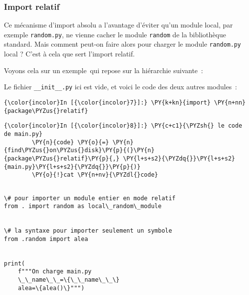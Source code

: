     \hypertarget{import-relatif}{%
\subsubsection{Import relatif}\label{import-relatif}}

    Ce mécanisme d'import absolu a l'avantage d'éviter qu'un module local,
par exemple \texttt{random.py}, ne vienne cacher le module
\texttt{random} de la bibliothèque standard. Mais comment peut-on faire
alors pour charger le module \texttt{random.py} local ? C'est à cela que
sert l'import relatif.

Voyons cela sur un exemple~qui repose sur la hiérarchie suivante~:

\begin{Shaded}
\begin{Highlighting}[frame=lines,framerule=0.6mm,rulecolor=\color{asisframecolor}]
\end{Highlighting}
\end{Shaded}

    Le fichier \texttt{\_\_init\_\_.py} ici est vide, et voici le code des
deux autres modules~:

    \begin{Verbatim}[commandchars=\\\{\},frame=single,framerule=0.3mm,rulecolor=\color{cellframecolor}]
{\color{incolor}In [{\color{incolor}7}]:} \PY{k+kn}{import} \PY{n+nn}{package\PYZus{}relatif}
\end{Verbatim}


    \begin{Verbatim}[commandchars=\\\{\},frame=single,framerule=0.3mm,rulecolor=\color{cellframecolor}]
{\color{incolor}In [{\color{incolor}8}]:} \PY{c+c1}{\PYZsh{} le code de main.py}
        \PY{n}{code} \PY{o}{=} \PY{n}{find\PYZus{}on\PYZus{}disk}\PY{p}{(}\PY{n}{package\PYZus{}relatif}\PY{p}{,} \PY{l+s+s2}{\PYZdq{}}\PY{l+s+s2}{main.py}\PY{l+s+s2}{\PYZdq{}}\PY{p}{)}
        \PY{o}{!}cat \PY{n+nv}{\PYZdl{}code}
\end{Verbatim}


    \begin{Verbatim}[commandchars=\\\{\},frame=single,framerule=0.3mm,rulecolor=\color{cellframecolor}]

\# pour importer un module entier en mode relatif
from . import random as local\_random\_module


\# la syntaxe pour importer seulement un symbole
from .random import alea


print(
    f"""On charge main.py
    \_\_name\_\_=\{\_\_name\_\_\}
    alea=\{alea()\}""")
\end{Verbatim}

